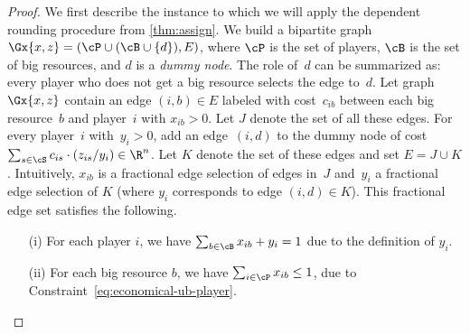 \documentclass[a4paper,USenglish,cleveref,thm-restate]{lipics-v2021}
\begin{document}
\begin{proof}
We first describe the instance to which we will apply the dependent rounding procedure from \cref{thm:assign}.
We build a bipartite graph $\Gx{x,z} = (\cP\cup (\cB \cup \{d\}), E)$, where $\cP$ is the set of players, $\cB$ is the set of big resources, and $d$ is a \textit{dummy node}. 
The role of~$d$ can be summarized as: every player who does not get a big resource selects
the edge to~$d$. 
Let graph~$\Gx{x,z}$ contain an edge $(i,b) \in E$ labeled with cost~$c_{ib}$ between each big resource~$b$ and player~$i$ with $x_{ib} > 0$. 
Let $J$ denote the set of all these edges. 
For every player~$i$ with~$y_i > 0$, add an edge~$(i, d)$ to the dummy node of cost~$\sum_{s \in \cS} c_{is} \cdot (z_{is}/y_i) \in \R^n$.
Let $K$ denote the set of these edges and
set $E = J\cup K$.
Intuitively, $x_{ib}$ is a fractional edge selection
of edges in~$J$ and~$y_i$ a fractional edge selection of $K$ (where $y_i$ corresponds to edge $(i, d)\in K$).
This fractional edge set satisfies the following.
\smallskip
\begin{enumerate}
    \item[(i)] For each player $i$, we have $\sum_{b \in \cB} x_{ib} + y_i = 1$ due to the definition of $y_i$.
    \item[(ii)] For each big resource $b$, we have $\sum_{i \in \cP} x_{ib} \leq 1$, due to Constraint~\eqref{eq:economical-ub-player}.
\end{enumerate}


\end{proof}
\end{document}
